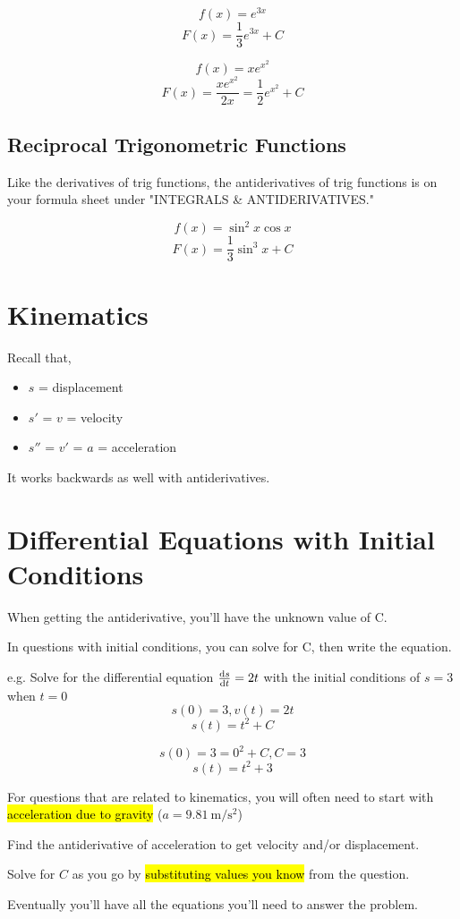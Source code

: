 \documentclass[a4paper,12pt]{article}
\begin{document}
$$f(x) = e^{3x}$$
$$F(x) = \frac{1}{3}e^{3x} + C$$

$$f(x) = xe^{x^2}$$
$$F(x) = \frac{xe^{x^2}}{2x} = \frac{1}{2}e^{x^2} + C$$

\subsection{Reciprocal Trigonometric Functions}
Like the derivatives of trig functions, the antiderivatives of trig functions is on your formula sheet under "INTEGRALS \& ANTIDERIVATIVES."

$$f(x) = \sin^2{x}\cos{x}$$
$$F(x) = \frac{1}{3}\sin^3{x} + C$$

\pagebreak

\section{Kinematics}
Recall that,
\begin{itemize}
    \item{$s$ = displacement}
    \item{$s'$ = $v$ = velocity}
    \item{$s''$ = $v'$ = $a$ = acceleration}
\end{itemize}
It works backwards as well with antiderivatives.

\section{Differential Equations with Initial Conditions}
When getting the antiderivative, you'll have the unknown value of C.

In questions with initial conditions, you can solve for C, then write the equation.

e.g. Solve for the differential equation $\dv{s}{t} = 2t$ with the initial conditions of $s = 3$ when $t = 0$
$$s(0) = 3, v(t) = 2t$$
$$s(t) = t^2 + C$$

$$s(0) = 3 = 0^2 + C, C = 3$$
$$s(t) = t^2 + 3$$

For questions that are related to kinematics, you will often need to start with \hl{acceleration due to gravity} ($a = \SI{9.81}{\m/\s^2}$)

Find the antiderivative of acceleration to get velocity and/or displacement. 

Solve for $C$ as you go by \hl{substituting values you know} from the question.

Eventually you'll have all the equations you'll need to answer the problem.
\end{document}
